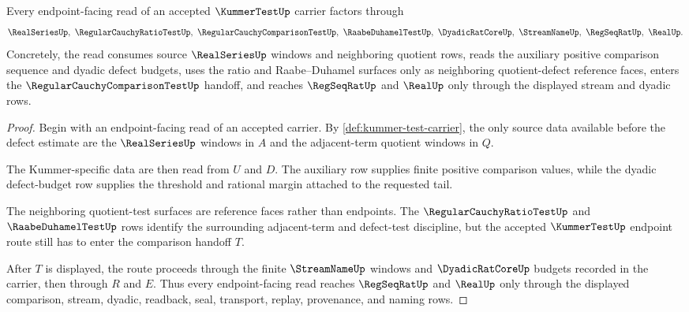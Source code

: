 \begin{theorem}\label{thm:kummer-test-cauchy-tail-handoff}
Every endpoint-facing read of an accepted $\KummerTestUp$ carrier factors through
$$
\RealSeriesUp,\ \RegularCauchyRatioTestUp,\ \RegularCauchyComparisonTestUp,\ \RaabeDuhamelTestUp,\ \DyadicRatCoreUp,\ \StreamNameUp,\ \RegSeqRatUp,\ \RealUp.
$$
Concretely, the read consumes source $\RealSeriesUp$ windows and neighboring quotient rows, reads the auxiliary positive comparison sequence and dyadic defect budgets, uses the ratio and Raabe--Duhamel surfaces only as neighboring quotient-defect reference faces, enters the $\RegularCauchyComparisonTestUp$ handoff, and reaches $\RegSeqRatUp$ and $\RealUp$ only through the displayed stream and dyadic rows.
\end{theorem}
\begin{proof}
Begin with an endpoint-facing read of an accepted carrier. By \autoref{def:kummer-test-carrier}, the only source data available before the defect estimate are the $\RealSeriesUp$ windows in $A$ and the adjacent-term quotient windows in $Q$.

The Kummer-specific data are then read from $U$ and $D$. The auxiliary row supplies finite positive comparison values, while the dyadic defect-budget row supplies the threshold and rational margin attached to the requested tail.

The neighboring quotient-test surfaces are reference faces rather than endpoints. The $\RegularCauchyRatioTestUp$ and $\RaabeDuhamelTestUp$ rows identify the surrounding adjacent-term and defect-test discipline, but the accepted $\KummerTestUp$ endpoint route still has to enter the comparison handoff $T$.

After $T$ is displayed, the route proceeds through the finite $\StreamNameUp$ windows and $\DyadicRatCoreUp$ budgets recorded in the carrier, then through $R$ and $E$. Thus every endpoint-facing read reaches $\RegSeqRatUp$ and $\RealUp$ only through the displayed comparison, stream, dyadic, readback, seal, transport, replay, provenance, and naming rows.
\end{proof}


